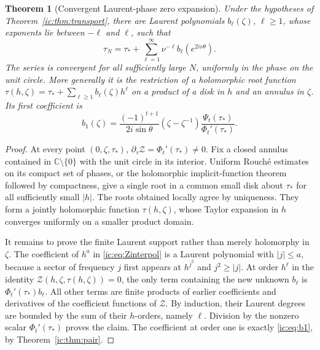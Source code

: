 \documentclass[11pt,a4paper]{article}
\numberwithin{equation}{section}
\newtheorem{theorem}{Theorem}[section]
\theoremstyle{definition}
\theoremstyle{remark}
\newcommand{\CC}{\mathbb C}
\begin{document}
\begin{theorem}[Convergent Laurent-phase zero expansion]
\label{ic:thm:convergentzeros}
Under the hypotheses of Theorem~\ref{ic:thm:transport}, there are Laurent
polynomials $b_\ell(\zeta)$, $\ell\ge1$, whose exponents lie between
$-\ell$ and $\ell$, such that
\begin{equation}\label{ic:eq:zerotaylor}
 \tau_N=\tau_*+\sum_{\ell=1}^{\infty}
 \nu^{-\ell}b_\ell(e^{2i\nu\theta}).
\end{equation}
The series is convergent for all sufficiently large $N$, uniformly in
the phase on the unit circle. More generally it is the restriction of a
holomorphic root function
$\tau(h,\zeta)=\tau_*+\sum_{\ell\ge1}b_\ell(\zeta)h^\ell$
on a product of a disk in $h$ and an annulus in $\zeta$. Its first
coefficient is
\begin{equation}\label{ic:eq:b1}
 b_1(\zeta)=
 \frac{(-1)^{t+1}}{2i\sin\theta}
 (\zeta-\zeta^{-1})
 \frac{\Psi_t(\tau_*)}{\Phi_t'(\tau_*)}.
\end{equation}
\end{theorem}
\begin{proof}
At every point $(0,\zeta,\tau_*)$,
$\partial_\tau\mathcal Z=\Phi_t'(\tau_*)\ne0$.
Fix a closed annulus contained in $\CC\setminus\{0\}$ with the unit
circle in its interior. Uniform Rouch\'e estimates on its compact set of
phases, or the holomorphic implicit-function theorem followed by
compactness, give a single root in a common small disk about $\tau_*$
for all sufficiently small $|h|$. The roots obtained locally agree by
uniqueness. They form a jointly holomorphic function $\tau(h,\zeta)$,
whose Taylor expansion in $h$ converges uniformly on a smaller product
domain.

It remains to prove the finite Laurent support rather than merely
holomorphy in $\zeta$. The coefficient of $h^a$ in
\eqref{ic:eq:Zinterpol} is a Laurent polynomial with $|j|\le a$, because a
sector of frequency $j$ first appears at $h^{j^2}$ and $j^2\ge|j|$.
At order $h^\ell$ in the identity
$\mathcal Z(h,\zeta,\tau(h,\zeta))=0$, the only term containing the new
unknown $b_\ell$ is $\Phi_t'(\tau_*)b_\ell$. All other terms are finite
products of earlier coefficients and derivatives of the coefficient
functions of $\mathcal Z$. By induction, their Laurent degrees are
bounded by the sum of their $h$-orders, namely $\ell$. Division by the
nonzero scalar $\Phi_t'(\tau_*)$ proves the claim. The coefficient at
order one is exactly \eqref{ic:eq:b1}, by Theorem~\ref{ic:thm:pair}.
\end{proof}
\end{document}
